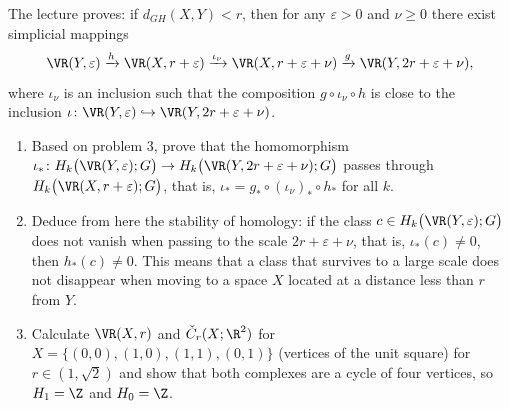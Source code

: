 \documentclass[a4paper,12pt]{report}
\begin{document}
\begin{task}
The lecture proves\textup{:} if $d_{GH}(X, Y) < r$, then for any $\varepsilon > 0$ and $\nu \ge 0$ there exist simplicial mappings
\[
\VR(Y, \varepsilon) \xrightarrow{h} \VR(X, r+\varepsilon) \xrightarrow{\iota_\nu} \VR(X, r+\varepsilon+\nu) \xrightarrow{g} \VR(Y, 2r+\varepsilon+\nu),
\]
where $\iota_\nu$ is an inclusion such that the composition $g \circ \iota_\nu \circ h$ is close to the inclusion $\iota \colon \VR(Y, \varepsilon) \hookrightarrow \VR(Y, 2r+\varepsilon+\nu)$.
\begin{enumerate}[label=\textup{(\alph*)}]
\item Based on problem \textup{3}, prove that the homomorphism $\iota_* \colon H_k\bigl(\VR(Y, \varepsilon); G\bigr) \to H_k\bigl(\VR(Y, 2r+\varepsilon+\nu); G\bigr)$ passes through $H_k\bigl(\VR(X, r+\varepsilon); G\bigr)$, that is, $\iota_* = g_* \circ (\iota_\nu)_* \circ h_*$ for all $k$.
\item Deduce from here the stability of homology\textup{:} if the class $c \in H_k\bigl(\VR(Y, \varepsilon); G\bigr)$ does not vanish when passing to the scale $2r+\varepsilon+\nu$, that is, $\iota_*(c) \neq 0$, then $h_*(c) \neq 0$. This means that a class that survives to a large scale does not disappear when moving to a space $X$ located at a distance less than $r$ from $Y$.
\item Calculate $\VR(X, r)$ and $\check C_r(X; \R^2)$ for $X = \{(0,0), (1,0), (1,1), (0,1)\}$ \textup{(}vertices of the unit square\textup{)} for $r \in (1, \sqrt{2})$ and show that both complexes are a cycle of four vertices, so $H_1 = \Z$ and $H_0 = \Z$. 
\end{enumerate}
\end{task}
\end{document}
